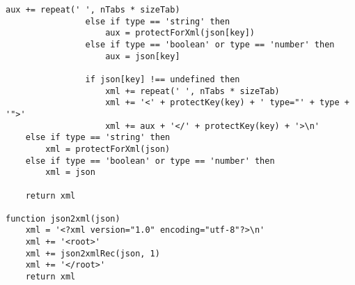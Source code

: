 \begin{lstlisting}[language=pseudocode, caption=Algoritmo de conversão de \acrshort{json} para \acrshort{xml}]
                    aux += repeat(' ', nTabs * sizeTab)
                else if type == 'string' then
                    aux = protectForXml(json[key])
                else if type == 'boolean' or type == 'number' then
                    aux = json[key]

                if json[key] !== undefined then
                    xml += repeat(' ', nTabs * sizeTab)
                    xml += '<' + protectKey(key) + ' type="' + type + '">'
                    xml += aux + '</' + protectKey(key) + '>\n'
    else if type == 'string' then
        xml = protectForXml(json)
    else if type == 'boolean' or type == 'number' then
        xml = json

    return xml

function json2xml(json)
    xml = '<?xml version="1.0" encoding="utf-8"?>\n'
    xml += '<root>'
    xml += json2xmlRec(json, 1)
    xml += '</root>'
    return xml
\end{lstlisting}

